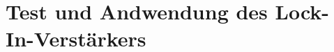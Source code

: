 \section{Test und Andwendung des Lock-In-Verstärkers} %
\label{sec:Test_und_Andwendung_des_Lock-In-Verstärkers}



